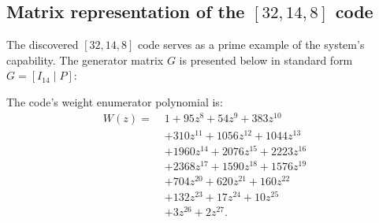 \subsection{Matrix representation of the $[32,14,8]$ code}
The discovered $[32,14,8]$ code serves as a prime example of the system's capability. The generator matrix $G$ is presented below in standard form $G = [I_{14} \mid P]$:
\begin{center}
\end{center}
The code's weight enumerator polynomial is:
\begin{align*}
W(z) =\; & 1 + 95z^8 + 54z^9 + 383z^{10} \\
&+ 310z^{11} + 1056z^{12} + 1044z^{13} \\
&+ 1960z^{14} + 2076z^{15} + 2223z^{16} \\
&+ 2368z^{17} + 1590z^{18} + 1576z^{19} \\
&+ 704z^{20} + 620z^{21} + 160z^{22} \\
&+ 132z^{23} + 17z^{24} + 10z^{25} \\
&+ 3z^{26} + 2z^{27}.
\end{align*}
